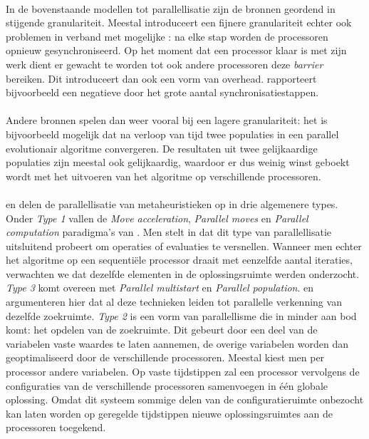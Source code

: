 \paragraph{}
In de bovenstaande modellen tot parallellisatie zijn de bronnen geordend in stijgende granulariteit. Meestal introduceert een fijnere granulariteit echter ook problemen in verband met mogelijke \absus{}: na elke stap worden de processoren opnieuw gesynchroniseerd. Op het moment dat een processor klaar is met zijn werk dient er gewacht te worden tot ook andere processoren deze \emph{barrier} bereiken. Dit introduceert dan ook een vorm van overhead. \cite{conf/glvlsi/HaldarNCB00} rapporteert bijvoorbeeld een negatieve \absu{} door het grote aantal synchronisatiestappen.

\paragraph{}
Andere bronnen spelen dan weer vooral bij een lagere granulariteit: het is bijvoorbeeld mogelijk dat na verloop van tijd twee populaties in een parallel evolutionair algoritme convergeren. De resultaten uit twee gelijkaardige populaties zijn meestal ook gelijkaardig, waardoor er dus weinig winst geboekt wordt met het uitvoeren van het algoritme op verschillende processoren.

\paragraph{}
 en \cite{crainicAndToulouse} delen de parallellisatie van metaheuristieken op in drie algemenere types. Onder \emph{Type 1} vallen de \emph{Move acceleration}, \emph{Parallel moves} en \emph{Parallel computation} paradigma's van . Men stelt in\cite{crainicAndToulouse} dat dit type van parallellisatie uitsluitend probeert om operaties of evaluaties te versnellen. Wanneer men echter het algoritme op een sequenti\"ele processor draait met eenzelfde aantal iteraties, verwachten we dat dezelfde elementen in de oplossingsruimte werden onderzocht. \emph{Type 3} komt overeen met \emph{Parallel multistart} en \emph{Parallel population}.  en  argumenteren hier dat al deze technieken leiden tot parallelle verkenning van dezelfde zoekruimte. \emph{Type 2} is een vorm van parallellisme die in  minder aan bod komt: het opdelen van de zoekruimte. Dit gebeurt door een deel van de variabelen vaste waardes te laten aannemen, de overige variabelen worden dan geoptimaliseerd door de verschillende processoren. Meestal kiest men per processor andere variabelen. Op vaste tijdstippen zal een processor vervolgens de configuraties van de verschillende processoren samenvoegen in \'e\'en globale oplossing. Omdat dit systeem sommige delen van de configuratieruimte onbezocht kan laten worden op geregelde tijdstippen nieuwe oplossingsruimtes aan de processoren toegekend.

